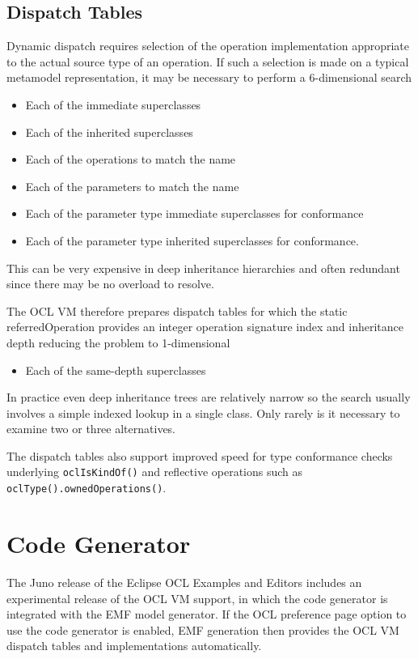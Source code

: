 \documentclass{acm_proc_article-sp}
\begin{document}
\subsection{Dispatch Tables}\label{DispatchTables}

Dynamic dispatch requires selection of the operation implementation appropriate to the actual source type of an operation. If such a selection is made on a typical metamodel representation, it may be necessary to perform a 6-dimensional search
\begin{itemize}
\item Each of the immediate superclasses 
\item Each of the inherited superclasses
\item Each of the operations to match the name
\item Each of the parameters to match the name
\item Each of the parameter type immediate superclasses for conformance
\item Each of the parameter type inherited superclasses for conformance.
\end{itemize}
This can be very expensive in deep inheritance hierarchies and often redundant since there may be no overload to resolve.

The OCL VM therefore prepares dispatch tables for which the static referredOperation provides an integer
operation signature index and inheritance depth reducing the problem to 1-dimensional 
\begin{itemize}
\item Each of the same-depth superclasses 
\end{itemize}

In practice even deep inheritance trees are relatively narrow so the search usually involves a simple indexed lookup in a single class. Only rarely is it necessary to examine two or three alternatives.

The dispatch tables also support improved speed for type conformance checks underlying \verb|oclIsKindOf()| and reflective operations such as \verb|oclType().ownedOperations()|.

\section{Code Generator}\label{VM future}

The Juno release of the Eclipse OCL Examples and Editors includes an experimental release of the OCL VM support,
in which the code generator is integrated with the EMF model generator. If the OCL preference page option to use the code generator is enabled, EMF generation then provides the OCL VM dispatch tables and implementations automatically.
\end{document}
